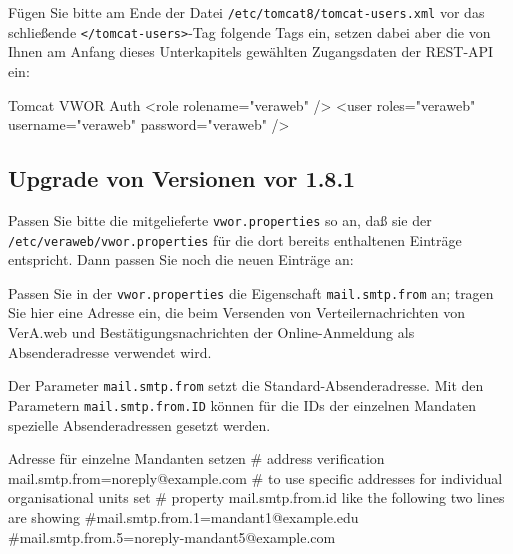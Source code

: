 \documentclass{tarentanleitung}
\newif\ifoa
\begin{document}
\begin{minipage}{\linewidth}
Fügen Sie bitte am Ende der Datei \texttt{/etc/tomcat8/tomcat-users.xml} vor
das schließende \texttt{</tomcat-users>}-Tag folgende Tags ein, setzen dabei
aber die von Ihnen am Anfang dieses Unterkapitels gewählten Zugangsdaten der
REST-API ein:

\begin{lstdump}[language=XML]{Tomcat VWOR Auth}
<role rolename="veraweb" />
<user roles="veraweb" username="veraweb" password="veraweb" />
\end{lstdump}
\end{minipage}

\subsection{Upgrade von Versionen vor 1.8.1}\label{subsec:upgrade-181}

Passen Sie bitte die mitgelieferte \texttt{vwor.properties} so an,
daß sie der \texttt{/etc/veraweb/vwor.properties} für die
dort bereits enthaltenen Einträge entspricht. Dann passen Sie noch
die neuen Einträge an:

\begin{minipage}{\linewidth}
Passen Sie in der \texttt{vwor.properties} die Eigenschaft
\texttt{mail.smtp.from} an; tragen Sie hier eine Adresse ein, die beim
Versenden von Verteilernachrichten von VerA.web und Bestätigungsnachrichten der Online-Anmeldung
als Absenderadresse verwendet wird.

Der Parameter \texttt{mail.smtp.from} setzt die Standard-Absenderadresse.
Mit den Parametern \texttt{mail.smtp.from.ID} können für die IDs der einzelnen
Mandaten spezielle Absenderadressen gesetzt werden.

\begin{lstdump}{Adresse für einzelne Mandanten setzen}
# address verification
mail.smtp.from=noreply@example.com
# to use specific addresses for individual organisational units set
# property mail.smtp.from.{id} like the following two lines are showing
#mail.smtp.from.1=mandant1@example.edu
#mail.smtp.from.5=noreply-mandant5@example.com
\end{lstdump}

\ifoa

Die \texttt{subject}- und
\texttt{content}-Parameter enthalten den Nachrichtenbetreff und
-inhalt; diese können Sie bei Bedarf anpassen; stellen Sie dabei
sicher, daß der Platzhalter \texttt{\$\{link\}} erhalten bleibt.

\fi%

\end{minipage}
\end{document}
